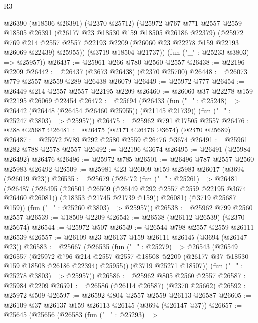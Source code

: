 \begin{lexlean}{R3}
\begin{coremodule}
      @26390
        (@18506 @26391)
        (@2370 @25712)
        (@25972
          @767
          @771
          @2557
          @2559
          @18505
          @26391
          (@26177 @23 @18530 @159 @18505 @26186 @22379)
          (@25972
            @769
            @214
            @2557
            @2557
            @22193
            @2209
            (@26060 @23 @22278 @159 @22193 @26069 @22439)
            @25955))
        (@3719 @18504 @21737))
      (fun ("_" : @25233 @3803) => @25957))
@26437 := @25961 @266 @780 @2560 @2557
@26438 := @22196 @2209
@26442 := @26437 (@3673 @26438) (@2370 @25700)
@26448 := @26073 @779 @2557 @2559 @289 @26438 @26079
@26449 := @25972 @777
@26454 := @26449 @214 @2557 @2557 @22195 @2209
@26460 := @26060 @37 @22278 @159 @22195 @26069 @22454
@26472 := @25694
    (@26433
      (fun ("_" : @25248) => @26442 (@26448 (@26454 @26460 @25955)) (@21145 @21739))
      (fun ("_" : @25247 @3803) => @25957))
@26475 := @25962 @791 @17505 @2557
@26476 := @288 @25687
@26481 := @26475 (@2171 @26476 @3674) (@2370 @25689)
@26487 := @25972 @789 @292 @2580 @2559 @26476 @3674
@26491 := @25961 @282 @788 @2578 @2557
@26492 := @22196 @3674
@26495 := @26491 (@25984 @26492) @26476
@26496 := @25972 @785
@26501 := @26496 @787 @2557 @2560 @25983 @26492
@26509 := @25981 @23 @26009 @159 @25983 @26017 (@3694 (@26019 @23))
@26535 := @25679
    (@26472
      (fun ("_" : @25261) =>
      @26481
        (@26487
          (@26495
            (@26501 @26509 (@26449 @292 @2557 @2559 @22195 @3674 @26460 @26081))
            (@18353 @21745 @21739 @159))
          @26081)
        (@3719 @25687 @159))
      (fun ("_" : @25260 @3803) => @25957))
@26538 := @25962 @799 @2560 @2557
@26539 := @18509 @2209
@26543 := @26538 (@26112 @26539) (@2370 @25674)
@26544 := @25972 @507
@26549 := @26544 @798 @2557 @2559 @26111 @26539
@26557 := @26109 @23 @26137 @159 @26111 @26145 (@3694 (@26147 @23))
@26583 := @25667
    (@26535
      (fun ("_" : @25279) =>
      @26543
        (@26549
          @26557
          (@25972
            @796
            @214
            @2557
            @2557
            @18508
            @2209
            (@26177 @37 @18530 @159 @18508 @26186 @22394)
            @25955))
        (@3719 @25271 @18507))
      (fun ("_" : @25278 @3803) => @25957))
@26586 := @25962 @805 @2560 @2557
@26587 := @25984 @2209
@26591 := @26586 (@26114 @26587) (@2370 @25662)
@26592 := @25972 @509
@26597 := @26592 @804 @2557 @2559 @26113 @26587
@26605 := @26109 @37 @26137 @159 @26113 @26145 (@3694 (@26147 @37))
@26657 := @25645
    (@25656
      (@26583
        (fun ("_" : @25293) =>

\end{coremodule}
\end{lexlean}
